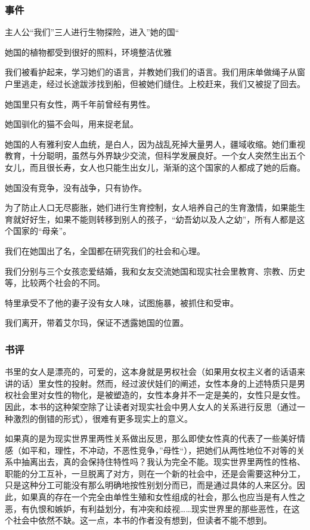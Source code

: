 \subsubsection{事件}
\begin{itemize*}
    \item 主人公“我们”三人进行生物探险，进入”她的国“
    \item 她国的植物都受到很好的照料，环境整洁优雅
    \item 我们被看护起来，学习她们的语言，并教她们我们的语言。我们用床单做绳子从窗户里逃走，经过长途跋涉找到船，但被她们缝住。上校赶来，我们又被捉了回去。
    \item 她国里只有女性，两千年前曾经有男性。
    \item 她国驯化的猫不会叫，用来捉老鼠。
    \item 她国的人有雅利安人血统，是白人，因为战乱死掉大量男人，疆域收缩。她们重视教育，十分聪明，虽然与外界缺少交流，但科学发展良好。一个女人突然生出五个女儿，而且很长寿，女人也只能生出女儿，渐渐的这个国家的人都成了她的后裔。
    \item 她国没有竞争，没有战争，只有协作。
    \item 为了防止人口无尽膨胀，她们进行生育控制，女人培养自己的生育激情，如果能生育就好好生，如果不能则转移到别人的孩子，“幼吾幼以及人之幼”，所有人都是这个国家的“母亲”。
    \item 我们在她国出了名，全国都在研究我们的社会和心理。
    \item 我们分别与三个女孩恋爱结婚，我和女友交流她国和现实社会里教育、宗教、历史等，比较两个社会的不同。
    \item 特里承受不了他的妻子没有女人味，试图施暴，被抓住和受审。
    \item 我们离开，带着艾尔玛，保证不透露她国的位置。
\end{itemize*}

\subsubsection{书评}
书里的女人是漂亮的，可爱的，这本身就是男权社会（如果用女权主义者的话语来讲的话）里女性的投射。然而，经过波伏娃们的阐述，女性本身的上述特质只是男权社会里对女性的物化，是被塑造的，女性本身并不一定是美的，女性只是女性。因此，本书的这种架空除了让读者对现实社会中男人女人的关系进行反思（通过一种激烈的倒错的形式），很难有更多现实上的意义。

如果真的是为现实世界里两性关系做出反思，那么即使女性真的代表了一些美好情感（如平和，理性，不冲动，不恶性竞争，”母性“），把她们从两性地位不对等的关系中抽离出去，真的会保持住特性吗？我认为完全不能。现实世界里两性的性格、职能的分工互补，一旦脱离了对方，则在一个新的社会中，还是会需要这种分工，只是这种分工可能没有那么明确地按性别划分而已，而是通过具体的人来区分。因此，如果真的存在一个完全由单性生殖和女性组成的社会，那么也应当是有人性之恶，有仇恨和嫉妒，有利益划分，有冲突和歧视……现实世界里的那些恶性，在这个社会中依然不缺。这一点，本书的作者没有想到，但读者不能不想到。

